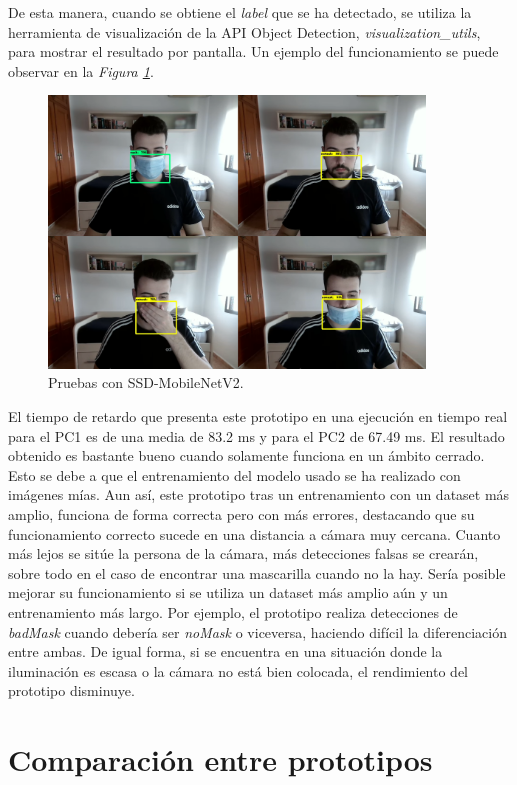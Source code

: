 De esta manera, cuando se obtiene el \textit{label} que se ha detectado, se utiliza la herramienta de visualización de la API Object Detection, \textit{visualization\_utils}, para mostrar el resultado por pantalla. Un ejemplo del funcionamiento se puede observar en la \textit{Figura \ref{fig:protoTensorFlow}}.

\begin{figure}[htp]
	\centering
	\includegraphics[width=10cm]{imagenes/tf_prueba.png}
	\caption{Pruebas con SSD-MobileNetV2.}
	\label{fig:protoTensorFlow}
\end{figure}

El tiempo de retardo que presenta este prototipo en una ejecución en tiempo real para el PC1 es de una media de 83.2 ms y para el PC2 de 67.49 ms. El resultado obtenido es bastante bueno cuando solamente funciona en un ámbito cerrado. Esto se debe a que el entrenamiento del modelo usado se ha realizado con imágenes mías. Aun así, este prototipo tras un entrenamiento con un dataset más amplio, funciona de forma correcta pero con más errores, destacando que su funcionamiento correcto sucede en una distancia a cámara muy cercana. Cuanto más lejos se sitúe la persona de la cámara, más detecciones falsas se crearán, sobre todo en el caso de encontrar una mascarilla cuando no la hay. Sería posible mejorar su funcionamiento si se utiliza un dataset más amplio aún y un entrenamiento más largo. Por ejemplo, el prototipo realiza detecciones de \textit{badMask} cuando debería ser \textit{noMask} o viceversa, haciendo difícil la diferenciación entre ambas. De igual forma, si se encuentra en una situación donde la iluminación es escasa o la cámara no está bien colocada, el rendimiento del prototipo disminuye.

\newpage
\section{Comparación entre prototipos}
\vspace{-0.7cm}

